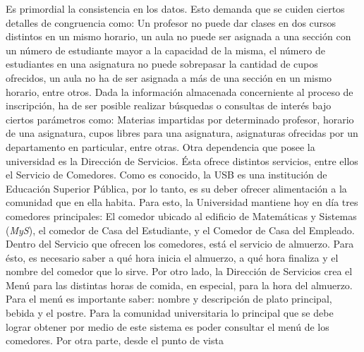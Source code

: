 \message{ !name(InformeFase2.tex)}\documentclass[12pt,a4paper,spanish]{article}
\begin{document}
\newline
\newline
\indent Es primordial la consistencia en los datos. Esto demanda que
se cuiden ciertos detalles de congruencia como: Un profesor no puede
dar clases en dos cursos distintos en un mismo horario, un aula no
puede ser asignada a una secci\'on con un n\'umero de estudiante mayor
a la capacidad de la misma, el n\'umero de estudiantes en una
asignatura no puede sobrepasar la cantidad de cupos ofrecidos, un aula
no ha de ser asignada a m\'as de una secci\'on en un mismo horario,
entre otros.
\newline
\newline
\indent Dada la informaci\'on almacenada concerniente al proceso de
inscripci\'on, ha de ser posible realizar b\'usquedas o consultas de
inter\'es bajo ciertos par\'ametros como: Materias impartidas por
determinado profesor, horario de una asignatura, cupos libres para una asignatura, asignaturas ofrecidas por un departamento en particular, entre otras.
\newline
\newline
\indent Otra dependencia que posee la universidad es  la Direcci\'on
de Servicios. \'Esta ofrece distintos servicios, entre ellos el
Servicio de Comedores. Como es conocido, la USB es una instituci\'on de
Educaci\'on Superior P\'ublica, por lo tanto, es su deber ofrecer
alimentaci\'on a la comunidad que en ella habita. Para esto, la
Universidad mantiene hoy en d\'ia tres comedores principales: El
comedor ubicado al edificio de Matem\'aticas y Sistemas (\emph{MyS}),
el comedor de Casa del Estudiante, y el Comedor de Casa del
Empleado. 
\newline
\newline
\indent Dentro del Servicio que ofrecen los comedores, est\'a el
servicio de almuerzo. Para \'esto, es necesario saber a qu\'e hora
inicia el almuerzo, a qu\'e hora finaliza y el nombre del comedor que
lo sirve.
\newline
\newline
Por otro lado, la Direcci\'on de Servicios crea el Men\'u para las
distintas horas de comida, en especial, para la hora del
almuerzo. Para el men\'u es importante saber: nombre y descripci\'on
de plato principal, bebida y el postre. 
\newline
\newline
\indent Para la comunidad universitaria lo principal que se debe
lograr obtener por medio de este sistema es poder consultar el men\'u
de los comedores. Por otra parte, desde el punto de vista
\end{document}
